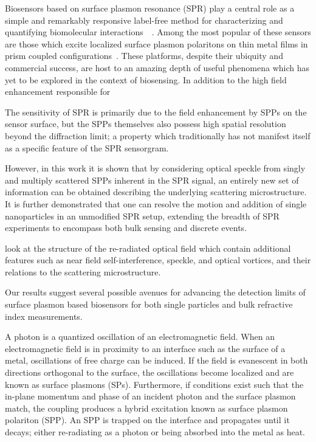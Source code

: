 Biosensors based on surface plasmon resonance (SPR) play a central role as
a simple and remarkably responsive label-free method for characterizing and
quantifying biomolecular
interactions~\cite{homola1999surface}~\cite{homola2006surface}.  Among the
most popular of these sensors are those which excite localized surface
plasmon polaritons on thin metal films in prism coupled
configurations~\cite{hoa2007towards}.  These platforms, despite their
ubiquity and commercial success, are host to an amazing depth of useful
phenomena which has yet to be explored in the context of biosensing.  In
addition to the high field enhancement responsible for 

The
sensitivity of SPR is primarily due to the field enhancement by SPPs on the
sensor surface, but the SPPs themselves also possess high spatial
resolution beyond the diffraction limit; a property which traditionally has
not manifest itself as a specific feature of the SPR sensorgram.  

However, in this work it is shown that by considering optical speckle from
singly and multiply scattered SPPs inherent in the SPR signal, an entirely
new set of information can be obtained describing the underlying scattering
microstructure.  It is further demonstrated that one can resolve the motion
and addition of single nanoparticles in an unmodified SPR setup, extending
the breadth of SPR experiments to encompass both bulk sensing and discrete
events.



look at the structure of the re-radiated optical field which contain
additional features such as near field self-interference, speckle, and
optical vortices, and their relations to the scattering microstructure.

Our results suggest several possible avenues for advancing the detection
limits of surface plasmon based biosensors for both single particles and
bulk refractive index measurements.

A photon is a quantized oscillation of an electromagnetic field.  When an
electromagnetic  field is in proximity to an interface such as the surface
of a metal, oscillations of free charge can be induced.  If the field is
evanescent in both directions orthogonal to the surface, the oscillations
become localized and are known as surface plasmons (SPs).  Furthermore, if
conditions exist such that the in-plane momentum and phase of an incident
photon and the surface plasmon match, the coupling produces a hybrid
excitation known as surface plasmon polariton (SPP).  An SPP is trapped on
the interface and propagates until it decays; either re-radiating as a
photon or being absorbed into the metal as heat.

